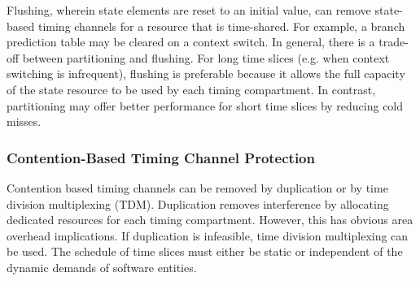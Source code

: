 Flushing, wherein state elements are reset to an initial value,
can remove state-based timing channels for a resource that is time-shared.
For example, a branch prediction table may be cleared on a context switch.
In general, there is a trade-off between partitioning and flushing.
For long time slices (e.g. when context switching is infrequent), flushing is 
preferable because it allows the full capacity of the state resource to be used by
each timing compartment. In contrast, partitioning may
offer better performance for short time slices by reducing cold misses.

\subsubsection{Contention-Based Timing Channel Protection}

Contention based timing channels can be removed by duplication or by
time division multiplexing (TDM). Duplication removes interference by
allocating dedicated resources for each timing compartment.
However, this has obvious area overhead implications. If duplication is 
infeasible, time division multiplexing can be used.
The schedule of time slices must either be static or independent of the dynamic 
demands of software entities.

